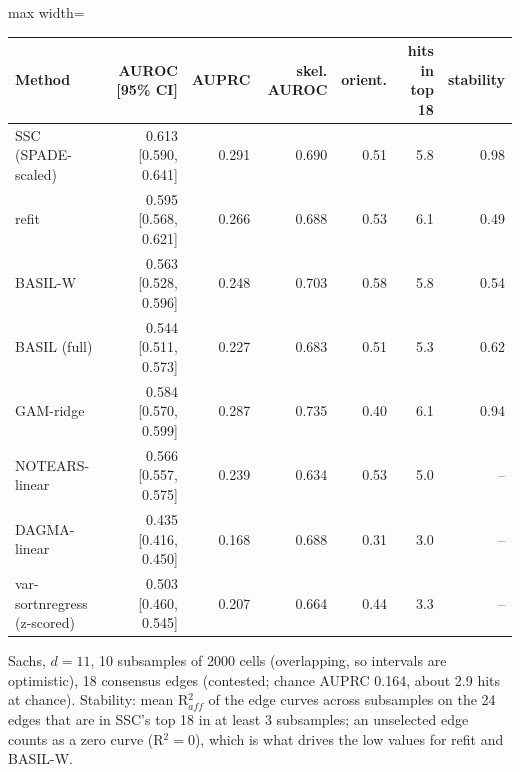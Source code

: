 \begin{adjustbox}{max width=\textwidth}
\begin{tabular}{lrrrrrr}
\toprule
Method & AUROC [95\% CI] & AUPRC & skel. AUROC & orient. & hits in top 18 & stability \\
\midrule
SSC (SPADE-scaled) & 0.613 [0.590, 0.641] & 0.291 & 0.690 & 0.51 & 5.8 & 0.98 \\
refit & 0.595 [0.568, 0.621] & 0.266 & 0.688 & 0.53 & 6.1 & 0.49 \\
BASIL-W & 0.563 [0.528, 0.596] & 0.248 & 0.703 & 0.58 & 5.8 & 0.54 \\
BASIL (full) & 0.544 [0.511, 0.573] & 0.227 & 0.683 & 0.51 & 5.3 & 0.62 \\
GAM-ridge & 0.584 [0.570, 0.599] & 0.287 & 0.735 & 0.40 & 6.1 & 0.94 \\
NOTEARS-linear & 0.566 [0.557, 0.575] & 0.239 & 0.634 & 0.53 & 5.0 & -- \\
DAGMA-linear & 0.435 [0.416, 0.450] & 0.168 & 0.688 & 0.31 & 3.0 & -- \\
var-sortnregress (z-scored) & 0.503 [0.460, 0.545] & 0.207 & 0.664 & 0.44 & 3.3 & -- \\
\bottomrule
\end{tabular}
\end{adjustbox}

\smallskip
{\footnotesize Sachs, $d=11$, 10 subsamples of 2000 cells (overlapping, so intervals are optimistic), 18 consensus edges (contested; chance AUPRC 0.164, about 2.9 hits at chance). Stability: mean R$^2_{aff}$ of the edge curves across subsamples on the 24 edges that are in SSC's top 18 in at least 3 subsamples; an unselected edge counts as a zero curve (R$^2=0$), which is what drives the low values for refit and BASIL-W.}
